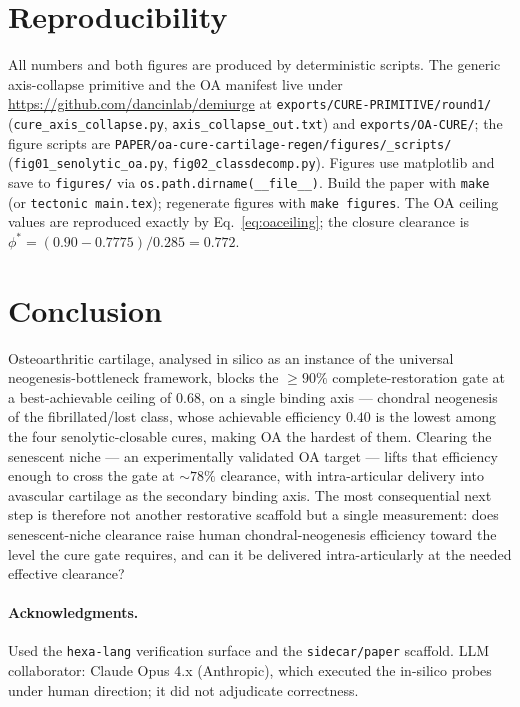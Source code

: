 \documentclass[11pt,a4paper]{article}
\begin{document}
\section{Reproducibility}
\label{sec:repro}
All numbers and both figures are produced by deterministic scripts. The generic
axis-collapse primitive and the OA manifest live under
\url{https://github.com/dancinlab/demiurge} at \texttt{exports/CURE-PRIMITIVE/round1/}
(\texttt{cure\_axis\_collapse.py}, \texttt{axis\_collapse\_out.txt}) and
\texttt{exports/OA-CURE/}; the figure scripts are
\texttt{PAPER/oa-cure-cartilage-regen/figures/\_scripts/}
(\texttt{fig01\_senolytic\_oa.py}, \texttt{fig02\_classdecomp.py}). Figures use
matplotlib and save to \texttt{figures/} via \texttt{os.path.dirname(\_\_file\_\_)}.
Build the paper with \texttt{make} (or \texttt{tectonic main.tex}); regenerate figures
with \texttt{make figures}. The OA ceiling values are reproduced exactly by
Eq.~\eqref{eq:oaceiling}; the closure clearance is
$\phi^\ast=(0.90-0.7775)/0.285=0.772$.

\section{Conclusion}
\label{sec:conclusion}
Osteoarthritic cartilage, analysed in silico as an instance of the universal
neogenesis-bottleneck framework, blocks the $\geq 90\%$ complete-restoration gate at a
best-achievable ceiling of $0.68$, on a single binding axis --- chondral neogenesis of the
fibrillated/lost class, whose achievable efficiency $0.40$ is the lowest among the four
senolytic-closable cures, making OA the hardest of them. Clearing the senescent niche ---
an experimentally validated OA target --- lifts that efficiency enough to cross the gate at
${\sim}78\%$ clearance, with intra-articular delivery into avascular cartilage as the
secondary binding axis. The most consequential next step is therefore not another
restorative scaffold but a single measurement: does senescent-niche clearance raise human
chondral-neogenesis efficiency toward the level the cure gate requires, and can it be
delivered intra-articularly at the needed effective clearance?

\paragraph{Acknowledgments.}
Used the \texttt{hexa-lang} verification surface and the \texttt{sidecar/paper} scaffold.
LLM collaborator: Claude Opus 4.x (Anthropic), which executed the in-silico probes under
human direction; it did not adjudicate correctness.
\end{document}
